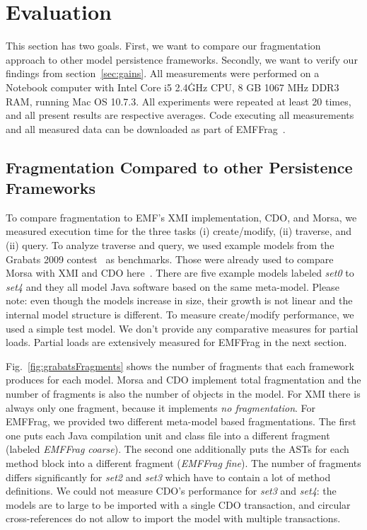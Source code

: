 \section{Evaluation}
\label{sec:evaluation}

This section has two goals. First, we want to compare our fragmentation approach to other model persistence frameworks. Secondly, we want to verify our findings from section~\ref{sec:gains}. 
All measurements were performed on a Notebook computer with Intel Core i5 2.4\.GHz CPU, 8 GB 1067 MHz DDR3 RAM, running Mac OS 10.7.3. All experiments were repeated at least 20 times, and all present results are respective averages. Code executing all measurements and all measured data can be downloaded as part of EMFFrag~\cite{EMFFragProject}.

\subsection{Fragmentation Compared to other Persistence Frameworks}

To compare fragmentation to EMF's XMI implementation, CDO, and Morsa, we measured execution time for the three tasks (i) create/modify, (ii) traverse, and (ii) query. To analyze traverse and query, we used example models from the Grabats 2009 contest~\cite{grabats} as benchmarks. Those were already used to compare Morsa with XMI and CDO here~\cite{morsa2011}. There are five example models labeled \emph{set0} to \emph{set4} and they all model Java software based on the same meta-model. Please note: even though the models increase in size, their growth is not linear and the internal model structure is different. To measure create/modify performance, we used a simple test model. We don't provide any comparative measures for partial loads. Partial loads are extensively measured for EMFFrag in the next section.

Fig.~\ref{fig:grabatsFragments} shows the number of fragments that each framework produces for each model. Morsa and CDO implement total fragmentation and the number of fragments is also the number of objects in the model. For XMI there is always only one fragment, because it implements \emph{no fragmentation}. For EMFFrag, we provided two different meta-model based fragmentations. The first one puts each Java compilation unit and class file into a different fragment (labeled \emph{EMFFrag coarse}). The second one additionally puts the ASTs for each method block into a different fragment (\emph{EMFFrag fine}). The number of fragments differs significantly for \emph{set2} and \emph{set3} which have to contain a lot of method definitions. We could not measure CDO's performance for \emph{set3} and \emph{set4}: the models are to large to be imported with a single CDO transaction, and circular cross-references do not allow to import the model with multiple transactions.

